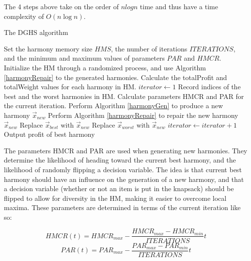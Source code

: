 \documentclass[titlepage]{article}
\begin{document}
The 4 steps above take on the order of $nlogn$ time and thus have a time complexity of ${O}(n\log{}n)$.

\vskip 0.5cm
\begin{breakablealgorithm}
\caption{The DGHS algorithm}\label{DGHS}
    \begin{algorithmic}[1]
        \State Set the harmony memory size $HMS$, the number of iterations $ITERATIONS$, and the minimum and maximum values of parameters $PAR$ and $HMCR$.
        \State Initialize the HM through a randomized process, and use Algorithm \ref{harmonyRepair} to the generated harmonies. Calculate the totalProfit and totalWeight values for each harmony in HM.
        \State $iterator \gets 1$
            \State Record indices of the best and the worst harmonies in HM.
            \State Calculate parameters HMCR and PAR for the current iteration.
            \State Perform Algorithm \ref{harmonyGen} to produce a new harmony $\Vec{x}_{new}$
            \State Perform Algorithm \ref{harmonyRepair} to repair the new harmony $\Vec{x}_{new}$
                \State Replace $\Vec{x}_{best} \text{ with } \Vec{x}_{new}$
                \State Replace $\Vec{x}_{worst} \text{ with } \Vec{x}_{new}$
            \EndIf
            \State $iterator \gets iterator+1$
        \EndWhile
        \State Output profit of best harmony
    \end{algorithmic}
\end{breakablealgorithm}
\vskip 0.5cm

The parameters HMCR and PAR are used when generating new harmonies. They determine the likelihood of heading toward the current best harmony, and the likelihood of randomly flipping a decision variable. The idea is that current best harmony should have an influence on the generation of a new harmony, and that a decision variable (whether or not an item is put in the knapsack) should be flipped to allow for diversity in the HM, making it easier to overcome local maxima. These parameters are determined in terms of the current iteration like so:

\begin{equation}
    HMCR(t) = HMCR_{max} - \frac{HMCR_{max}-HMCR_{min}}{ITERATIONS} t
\end{equation}
\begin{equation}
    PAR(t) = PAR_{max} - \frac{PAR_{max}-PAR_{min}}{ITERATIONS} t
\end{equation}
\end{document}
